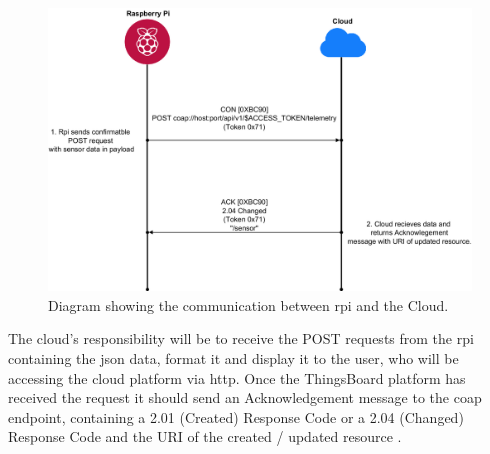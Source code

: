 \begin{figure}[H]
    \centering
    \includegraphics[width=\imageWidth\textwidth]{assets/rpi_cloud_communication.png}
    \caption{\label{fig:rpi_cloud_comms} Diagram showing the communication between \gls{rpi} and the Cloud.}
\end{figure}

The cloud's responsibility will be to receive the POST requests from the 
\gls{rpi} containing the \gls{json} data, format it and display it 
to the user, who will be accessing the cloud platform via \gls{http}. 
Once the ThingsBoard platform has received the request it should send an 
Acknowledgement message to the \gls{coap} endpoint, 
containing a 2.01 (Created) Response Code or a 2.04 (Changed) Response Code 
and the URI of the created / updated resource \citep{shelby_constrained_2014}. 